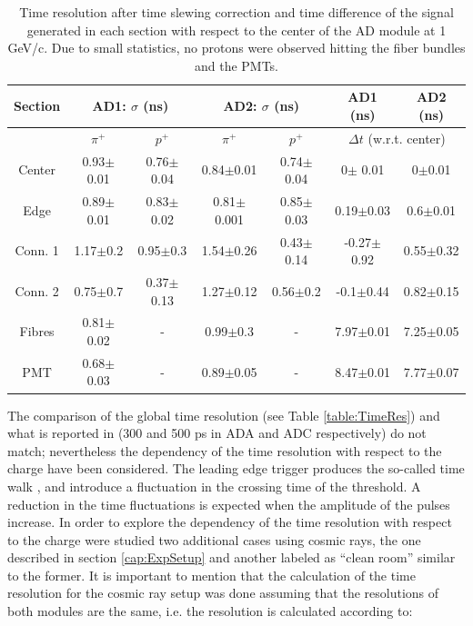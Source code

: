 	
	\begin{table}[hb!]
	\centering
	\caption{Time resolution after time slewing correction and time difference of the signal generated in each section with
	respect to the center of the AD module at 1 GeV/c. Due to small statistics, no protons were
	observed hitting the fiber bundles and the PMTs. }
	\begin{tabular}{|c||c c|c c|c c|}
		\hline
		Section & \multicolumn{2}{c|}{AD1: $\sigma$ (ns)} &\multicolumn{2}{c|}{AD2: $\sigma$ (ns)} & AD1 (ns) &AD2 (ns) \\\hline \hline 
		&     	$\pi^+$& 	$p^+$ &		$\pi^+$	      & $p^+$& \multicolumn{2}{c|}{$\Delta t$ (w.r.t. center)}\\%
		
		Center& 0.93$\pm$0.01	&0.76$\pm$0.04	&0.84$\pm$0.01	&0.74$\pm$0.04	& 0$\pm$ 0.01	&	0$\pm$0.01\\
		
		Edge &	0.89$\pm$0.01 &	0.83$\pm$0.02&	0.81$\pm$0.001&	0.85$\pm$0.03&	0.19$\pm$0.03&	0.6$\pm$0.01\\
		Conn. 1&	1.17$\pm$0.2 &	0.95$\pm$0.3&	1.54$\pm$0.26&	0.43$\pm$0.14&	-0.27$\pm$0.92&	0.55$\pm$0.32\\
		Conn. 2&	0.75$\pm$0.7 &	0.37$\pm$0.13&	1.27$\pm$0.12&	0.56$\pm$0.2&	-0.1$\pm$0.44&	0.82$\pm$0.15\\
		Fibres&	0.81$\pm$0.02 &	-	     &	0.99$\pm$0.3&	-	    &	7.97$\pm$0.01&	7.25$\pm$0.05\\
		PMT&		0.68$\pm$0.03 &	-	     &	0.89$\pm$0.05&	-	    &	8.47$\pm$0.01&	7.77$\pm$0.07\\
		\hline
	\end{tabular}
	\label{table:OtherRegions_Time}
	\end{table}

	
	
	The comparison of the global time resolution (see Table \ref{table:TimeRes}) and what is reported in \cite{ADNote} (300 and 500 ps in ADA and ADC respectively) do not match; nevertheless the dependency of the time resolution with respect to the charge have been considered.
	The leading edge trigger produces the so-called time walk \cite{FastTimeMethod}, and introduce a fluctuation in the crossing time of the threshold. 
	A reduction in the time fluctuations is expected when the amplitude of the pulses increase.
	In order to explore the dependency of the time resolution with respect to the charge were studied two additional cases using cosmic rays, the one described in section \ref{cap:ExpSetup} and another labeled as ``clean room'' similar to the former.
	It is important to mention that the calculation of the time resolution for the cosmic ray setup was done assuming that the resolutions of both modules are the same, i.e. the resolution is calculated according to:
	
